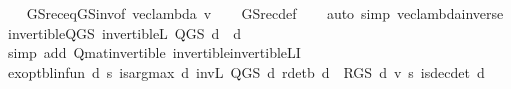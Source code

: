 \begin{isabellebody}
%
\isadelimproof
\ \ %
\endisadelimproof
%
\isatagproof
{}\isamarkupfalse%
\ GS{\isacharunderscore}{\kern0pt}rec{\isacharunderscore}{\kern0pt}eq{\isacharunderscore}{\kern0pt}GS{\isacharunderscore}{\kern0pt}inv{\isacharprime}{\kern0pt}{\isacharbrackleft}{\kern0pt}of\ {\isachardoublequoteopen}vec{\isacharunderscore}{\kern0pt}lambda\ v{\isachardoublequoteclose}{\isacharbrackright}{\kern0pt}\isanewline
\ \ \isamarkupfalse%
\ GS{\isacharunderscore}{\kern0pt}rec{\isacharunderscore}{\kern0pt}def\isanewline
\ \ \isamarkupfalse%
\ {\isacharparenleft}{\kern0pt}auto\ simp{\isacharcolon}{\kern0pt}\ vec{\isacharunderscore}{\kern0pt}lambda{\isacharunderscore}{\kern0pt}inverse{\isacharparenright}{\kern0pt}%
\endisatagproof
{\isafoldproof}%
%
\isadelimproof
\isanewline
%
\endisadelimproof
\isanewline
\isanewline
{}\isamarkupfalse%
\ invertible{\isacharunderscore}{\kern0pt}Q{\isacharunderscore}{\kern0pt}GS{\isacharcolon}{\kern0pt}\ {\isachardoublequoteopen}invertible\isactrlsub L\ {\isacharparenleft}{\kern0pt}Q{\isacharunderscore}{\kern0pt}GS\ d{\isacharparenright}{\kern0pt}{\isachardoublequoteclose}\ \ d\isanewline
%
\isadelimproof
\ \ %
\endisadelimproof
%
\isatagproof
{}\isamarkupfalse%
\ {\isacharparenleft}{\kern0pt}simp\ add{\isacharcolon}{\kern0pt}\ Q{\isacharunderscore}{\kern0pt}mat{\isacharunderscore}{\kern0pt}invertible\ invertible{\isacharunderscore}{\kern0pt}invertible\isactrlsub L{\isacharunderscore}{\kern0pt}I{\isacharparenleft}{\kern0pt}{}{\isacharparenright}{\kern0pt}{\isacharparenright}{\kern0pt}%
\endisatagproof
{\isafoldproof}%
%
\isadelimproof
\isanewline
%
\endisadelimproof
\isanewline
{}\isamarkupfalse%
\ ex{\isacharunderscore}{\kern0pt}opt{\isacharunderscore}{\kern0pt}blinfun{\isacharcolon}{\kern0pt}\ {\isachardoublequoteopen}{\isasymexists}d{\isachardot}{\kern0pt}\ {\isasymforall}s{\isachardot}{\kern0pt}\ is{\isacharunderscore}{\kern0pt}arg{\isacharunderscore}{\kern0pt}max\ {\isacharparenleft}{\kern0pt}{\isasymlambda}d{\isachardot}{\kern0pt}\ {\isacharparenleft}{\kern0pt}{\isacharparenleft}{\kern0pt}inv\isactrlsub L\ {\isacharparenleft}{\kern0pt}Q{\isacharunderscore}{\kern0pt}GS\ d{\isacharparenright}{\kern0pt}{\isacharparenright}{\kern0pt}\ {\isacharparenleft}{\kern0pt}r{\isacharunderscore}{\kern0pt}det\isactrlsub b\ d\ {\isacharplus}{\kern0pt}\ {\isacharparenleft}{\kern0pt}R{\isacharunderscore}{\kern0pt}GS\ d{\isacharparenright}{\kern0pt}\ v{\isacharparenright}{\kern0pt}{\isacharparenright}{\kern0pt}\ s{\isacharparenright}{\kern0pt}\ is{\isacharunderscore}{\kern0pt}dec{\isacharunderscore}{\kern0pt}det\ d{\isachardoublequoteclose}\isanewline

\end{isabellebody}
